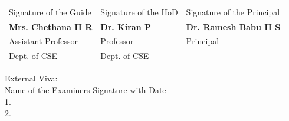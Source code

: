 \vspace{0.7 cm}
\begin{center}

\begin{table}[ht]
\centering
\begin{tabular}{p{5.5cm} p{5.5cm} p{5.5cm} }
Signature of the Guide & Signature of the HoD & Signature of the Principal \\
\textbf{Mrs. Chethana H R} & \textbf{Dr. Kiran P}  & \textbf{Dr. Ramesh Babu H S}\\
Assistant Professor & Professor & Principal \\ 
Dept. of CSE  & Dept. of CSE & \\ 
\end{tabular}

\end{table} 

\end{center}

\vspace{4pt}
\begin{flushleft}
External Viva:\\
Name of the Examiners         \hspace{5cm}          Signature with Date  \\
1.  \\
2. \\ 
			
\end{flushleft}
\thispagestyle{empty}





